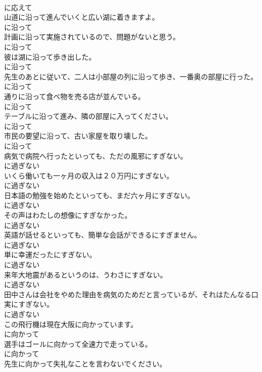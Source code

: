 \documentclass[8pt]{extreport}
\begin{document}
\begin{CJK}{UTF8}{min}
\\	に応えて
\\	山道に沿って進んでいくと広い湖に着きますよ。	
\\	に沿って
\\	計画に沿って実施されているので、問題がないと思う。	
\\	に沿って
\\	彼は湖に沿って歩き出した。	
\\	に沿って
\\	先生のあとに従いて、二人は小部屋の列に沿って歩き、一番奥の部屋に行った。	
\\	に沿って
\\	通りに沿って食べ物を売る店が並んでいる。	
\\	に沿って
\\	テーブルに沿って進み、隣の部屋に入ってください。	
\\	に沿って
\\	市民の要望に沿って、古い家屋を取り壊した。	
\\	に沿って
\\	病気で病院へ行ったといっても、ただの風邪にすぎない。	
\\	に過ぎない
\\	いくら働いても一ヶ月の収入は２０万円にすぎない。	
\\	に過ぎない
\\	日本語の勉強を始めたといっても、まだ六ヶ月にすぎない。	
\\	に過ぎない
\\	その声はわたしの想像にすぎなかった。	
\\	に過ぎない
\\	英語が話せるといっても、簡単な会話ができるにすぎません。	
\\	に過ぎない
\\	単に幸運だったにすぎない。	
\\	に過ぎない
\\	来年大地震があるというのは、うわさにすぎない。	
\\	に過ぎない
\\	田中さんは会社をやめた理由を病気のためだと言っているが、それはたんなる口実にすぎない。	
\\	に過ぎない
\\	この飛行機は現在大阪に向かっています。	
\\	に向かって
\\	選手はゴールに向かって全速力で走っている。	
\\	に向かって
\\	先生に向かって失礼なことを言わないでください。	

\end{CJK}
\end{document}
